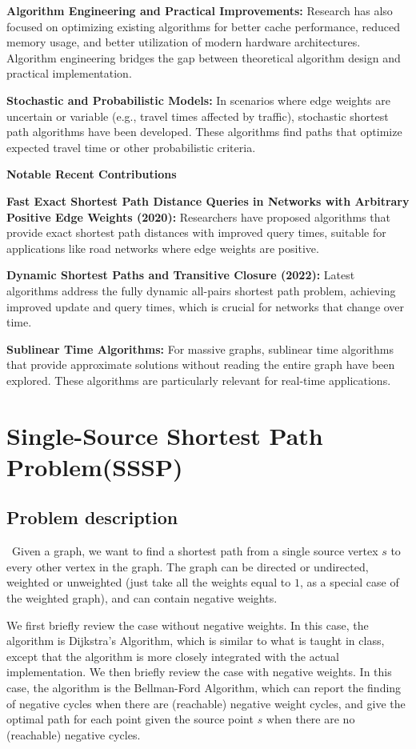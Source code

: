 \documentclass[11pt]{article}
\theoremstyle{plain}
\begin{document}
\textbf{Algorithm Engineering and Practical Improvements:} Research has also focused on optimizing existing algorithms for better cache performance, reduced memory usage, and better utilization of modern hardware architectures. Algorithm engineering bridges the gap between theoretical algorithm design and practical implementation.

\textbf{Stochastic and Probabilistic Models:} In scenarios where edge weights are uncertain or variable (e.g., travel times affected by traffic), stochastic shortest path algorithms have been developed. These algorithms find paths that optimize expected travel time or other probabilistic criteria.

\textbf{Notable Recent Contributions}

\textbf{Fast Exact Shortest Path Distance Queries in Networks with Arbitrary Positive Edge Weights (2020):} Researchers have proposed algorithms that provide exact shortest path distances with improved query times, suitable for applications like road networks where edge weights are positive.\ \cite{Akiba2013PL}

\textbf{Dynamic Shortest Paths and Transitive Closure (2022):} Latest algorithms address the fully dynamic all-pairs shortest path problem, achieving improved update and query times, which is crucial for networks that change over time.\ \cite{Sankowski2005}

\textbf{Sublinear Time Algorithms:} For massive graphs, sublinear time algorithms that provide approximate solutions without reading the entire graph have been explored. These algorithms are particularly relevant for real-time applications.\ \cite{Goldreich1998}


\section{Single-Source Shortest Path Problem(SSSP)}
\subsection{Problem description}\
Given a graph, we want to find a shortest path from a single source vertex $s$ to every other vertex 
in the graph. The graph can be directed or undirected, weighted or unweighted (just take all the 
weights equal to $1$, as a special case of the weighted graph), and can contain negative weights.

We first briefly review the case without negative weights. In this case, the algorithm is Dijkstra's 
Algorithm, which is similar to what is taught in class, except that the algorithm is more closely 
integrated with the actual implementation. We then briefly review the case with negative weights. 
In this case, the algorithm is the Bellman-Ford Algorithm, which can report the finding of negative 
cycles when there are (reachable) negative weight cycles, and give the optimal path for each point 
given the source point $s$ when there are no (reachable) negative cycles.
\end{document}
